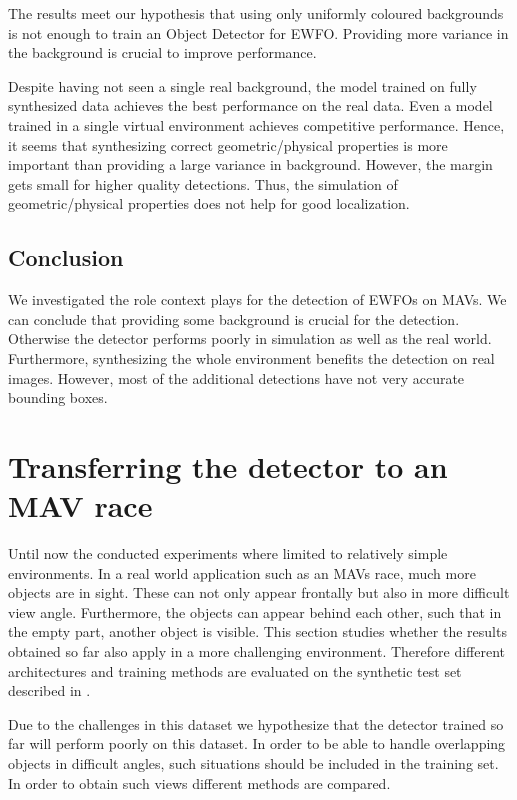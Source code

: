 The results meet our hypothesis that using only uniformly coloured backgrounds is not enough to train an Object Detector for \ac{EWFO}. Providing more variance in the background is crucial to improve performance.

Despite having not seen a single real background, the model trained on fully synthesized data achieves the best performance on the real data. Even a model trained in a single virtual environment achieves competitive performance. Hence, it seems that synthesizing correct geometric/physical properties is more important than providing a large variance in background. However, the margin gets small for higher quality detections. Thus, the simulation of geometric/physical properties does not help for good localization.

\subsection{Conclusion}

We investigated the role context plays for the detection of \acp{EWFO} on \acp{MAV}. We can conclude that providing some background is crucial for the detection. Otherwise the detector performs poorly in simulation as well as the real world. Furthermore, synthesizing the whole environment benefits the detection on real images. However, most of the additional detections have not very accurate bounding boxes.

\section{Transferring the detector to an \ac{MAV} race}

Until now the conducted experiments where limited to relatively simple environments. In a real world application such as an \acp{MAV} race, much more objects are in sight. These can not only appear frontally but also in more difficult view angle. Furthermore, the objects can appear behind each other, such that in the empty part, another object is visible. This section studies whether the results obtained so far also apply in a more challenging environment. Therefore different architectures and training methods are evaluated on the synthetic test set described in .

Due to the challenges in this dataset we hypothesize that the detector trained so far will perform poorly on this dataset. In order to be able to handle overlapping objects in difficult angles, such situations should be included in the training set. In order to obtain such views different methods are compared.

